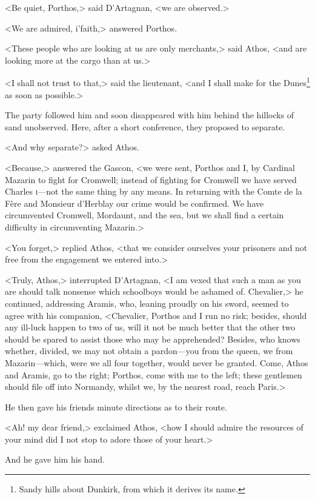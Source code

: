 <Be quiet, Porthos,> said D'Artagnan, <we are observed.>

<We are admired, i'faith,> answered Porthos.

<These people who are looking at us are only merchants,> said Athos, <and are looking more at the cargo than at us.>

<I shall not trust to that,> said the lieutenant, <and I shall make for the Dunes\footnote{Sandy hills about Dunkirk, from which it derives its name.} as soon as possible.>

The party followed him and soon disappeared with him behind the hillocks of sand unobserved. Here, after a short conference, they proposed to separate.

<And why separate?> asked Athos.

<Because,> answered the Gascon, <we were sent, Porthos and I, by Cardinal Mazarin to fight for Cromwell; instead of fighting for Cromwell we have served Charles \textsc{i}—not the same thing by any means. In returning with the Comte de la Fère and Monsieur d'Herblay our crime would be confirmed. We have circumvented Cromwell, Mordaunt, and the sea, but we shall find a certain difficulty in circumventing Mazarin.>

<You forget,> replied Athos, <that we consider ourselves your prisoners and not free from the engagement we entered into.>

<Truly, Athos,> interrupted D'Artagnan, <I am vexed that such a man as you are should talk nonsense which schoolboys would be ashamed of. Chevalier,> he continued, addressing Aramis, who, leaning proudly on his sword, seemed to agree with his companion, <Chevalier, Porthos and I run no risk; besides, should any ill-luck happen to two of us, will it not be much better that the other two should be spared to assist those who may be apprehended? Besides, who knows whether, divided, we may not obtain a pardon—you from the queen, we from Mazarin—which, were we all four together, would never be granted. Come, Athos and Aramis, go to the right; Porthos, come with me to the left; these gentlemen should file off into Normandy, whilst we, by the nearest road, reach Paris.>

He then gave his friends minute directions as to their route.

<Ah! my dear friend,> exclaimed Athos, <how I should admire the resources of your mind did I not stop to adore those of your heart.>

And he gave him his hand.

